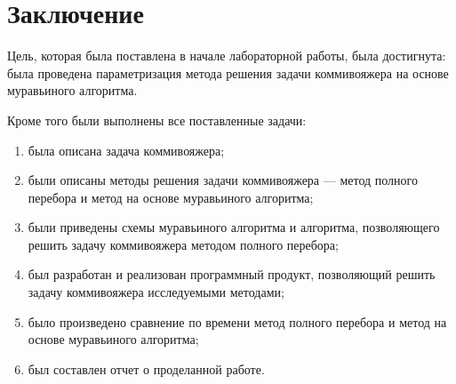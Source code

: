 \chapter*{Заключение}

Цель, которая была поставлена в начале лабораторной работы, была достигнута: была проведена параметризация метода решения задачи коммивояжера на основе муравьиного алгоритма.

Кроме того были выполнены все поставленные задачи:
\begin{enumerate}
	\item была описана задача коммивояжера;
	\item были описаны методы решения задачи коммивояжера --- метод полного перебора и метод на основе муравьиного алгоритма;
	\item были приведены схемы муравьиного алгоритма и алгоритма, позволяющего решить задачу коммивояжера методом полного перебора;
	\item был разработан и реализован программный продукт, позволяющий решить задачу коммивояжера исследуемыми методами;
	\item было произведено сравнение по времени метод полного перебора и метод на основе муравьиного алгоритма;
	\item был составлен отчет о проделанной работе.
\end{enumerate}